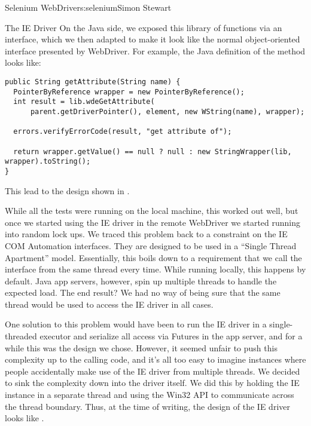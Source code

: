 \begin{aosachapter}{Selenium WebDriver}{s:selenium}{Simon Stewart}
\begin{aosasect1}{The IE Driver}
On the Java side, we exposed this library of functions via an
interface, which we then adapted to make it look like the normal object-oriented
interface presented by WebDriver. For example, the Java definition of
the  method looks like:

\begin{verbatim}
public String getAttribute(String name) {
  PointerByReference wrapper = new PointerByReference();
  int result = lib.wdeGetAttribute(
      parent.getDriverPointer(), element, new WString(name), wrapper);

  errors.verifyErrorCode(result, "get attribute of");

  return wrapper.getValue() == null ? null : new StringWrapper(lib, wrapper).toString();
}
\end{verbatim}

\noindent This lead to the design shown in .


While all the tests were running on the local machine, this worked out
well, but once we started using the IE driver in the remote WebDriver
we started running into random lock ups. We traced this problem back
to a constraint on the IE COM Automation interfaces. They are designed
to be used in a ``Single Thread Apartment'' model. Essentially, this
boils down to a requirement that we call the interface from the same
thread every time. While running locally, this happens by
default. Java app servers, however, spin up multiple threads to handle
the expected load. The end result? We had no way of being sure that
the same thread would be used to access the IE driver in all cases.

One solution to this problem would have been to run the IE driver in a
single-threaded executor and serialize all access via Futures in the
app server, and for a while this was the design we chose. However, it
seemed unfair to push this complexity up to the calling code, and it's
all too easy to imagine instances where people accidentally make use
of the IE driver from multiple threads. We decided to sink the
complexity down into the driver itself. We did this by holding the IE
instance in a separate thread and using the 
Win32 API to communicate across the thread boundary. Thus, at the time
of writing, the design of the IE driver looks like
.



\end{aosasect1}
\end{aosachapter}

